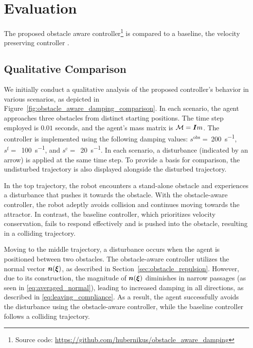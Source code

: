 \section{Evaluation}  \label{sec:evaluation} 
The proposed obstacle aware controller\footnote{Source code: \url{https://github.com/hubernikus/obstacle_aware_damping}} is compared to a baseline, the velocity preserving controller \cite{kronander2015passive}.

\subsection{Qualitative Comparison} \label{sec:qual_comp}
We initially conduct a qualitative analysis of the proposed controller's behavior in various scenarios, as depicted in Figure~\ref{fig:obstacle_aware_damping_comparison}. In each scenario, the agent approaches three obstacles from distinct starting positions. The time step employed is $0.01$ seconds, and the agent's mass matrix is $\mathcal{M} = \boldsymbol{I} m$. The controller is implemented using the following damping values:
$s^{\mathrm{obs}}=~$\qty{200}{s^{-1}},
$s^{\mathrm{f}}=$~\qty{100}{s^{-1}}, and
$s^{\mathrm{c}}=$~\qty{20}{s^{-1}}.
In each scenario, a disturbance (indicated by an arrow) is applied at the same time step. To provide a basis for comparison, the undisturbed trajectory is also displayed alongside the disturbed trajectory.

In the top trajectory, the robot encounters a stand-alone obstacle and experiences a disturbance that pushes it towards the obstacle. With the obstacle-aware controller, the robot adeptly avoids collision and continues moving towards the attractor. In contrast, the baseline controller, which prioritizes velocity conservation, fails to respond effectively and is pushed into the obstacle, resulting in a colliding trajectory.

Moving to the middle trajectory, a disturbance occurs when the agent is positioned between two obstacles. The obstacle-aware controller utilizes the normal vector $\boldsymbol{n}(\boldsymbol{\xi})$, as described in Section~\ref{sec:obstacle_repulsion}. However, due to its construction, the magnitude of $\boldsymbol{n}(\boldsymbol{\xi})$ diminishes in narrow passages (as seen in \eqref{eq:averaged_normal}), leading to increased damping in all directions, as described in \eqref{eq:leaving_compliance}. As a result, the agent successfully avoids the disturbance using the obstacle-aware controller, while the baseline controller follows a colliding trajectory.

